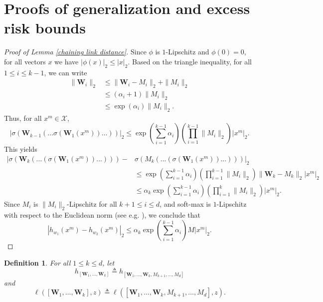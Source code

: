 \documentclass{article}
\newtheorem{definition}{Definition}
\newcommand{\X}{\mathcal{X}}
\begin{document}
\section{Proofs of generalization and excess risk bounds}\label{gen bounds section}
\begin{proof}[Proof of Lemma \ref{chaining link distance}] Since $\phi$ is $1$-Lipschitz and $\phi(0)=0$, for all vectors $x$ we have $|\phi(x)|_2\leq |x|_2$. Based on the triangle inequality, for all $1\leq i\leq k-1$, we can write 
\begin{align}
	\|\mathbf{W}_i\|_2&\leq \|\mathbf{W}_i-M_i\|_2+\|M_i\|_2\nonumber\\
					  &\leq (\alpha_i+1)\|M_i\|_2\nonumber\\
					  &\leq \exp(\alpha_i)\|M_i\|_2.\nonumber
\end{align}
Thus, for all $x^m\in \X$,
\begin{equation}
	|\sigma(\mathbf{W}_{k-1}(\dots \sigma(\mathbf{W}_1(x^m))\dots ))|_2\leq \exp\left(\sum_{i=1}^{k-1}\alpha_i\right)\left(\prod_{i=1}^{k-1}\|M_i\|_2\right)|x^m|_2. \nonumber
\end{equation}
This yields
\begin{align}
	|\sigma(\mathbf{W}_{k}(\dots(\sigma(\mathbf{W}_1(x^m))\dots)))-&\sigma(M_{k}(\dots(\sigma(\mathbf{W}_1(x^m))\dots)))|_2\nonumber\\
	&\leq \exp\left(\sum_{i=1}^{k-1}\alpha_i\right)\left(\prod_{i=1}^{k-1}\|M_i\|_2\right)\|\mathbf{W}_k-M_k\|_2|x^m|_2\nonumber\\
	&\leq \alpha_k \exp\left(\sum_{i=1}^{k-1}\alpha_i\right)\left(\prod_{i=1}^{k}\|M_i\|_2\right)|x^m|_2.\nonumber
\end{align}
Since $M_i$ is $\|M_i\|_2$-Lipschitz for all $k+1\leq i\leq d$, and soft-max is $1$-Lipschitz with respect to the Euclidean norm (see e.g. \cite{gao2017properties}), we conclude that
\begin{equation}
		|h_{w_1}(x^m)-h_{w_2}(x^m)|_2 \leq \alpha_k\exp\left(\sum_{i=1}^{k-1} \alpha_i\right) M|x^m|_2.\nonumber
	\end{equation}
\end{proof}
\begin{definition}
	For all $1\leq k \leq d$, let 
	\begin{equation}
	h_{[\mathbf{W}_1,\dots,\mathbf{W}_k]}\triangleq  h_{[\mathbf{W}_1,\dots,\mathbf{W}_k,M_{k+1},\dots,M_d]}\nonumber
	\end{equation}
and 
\begin{equation}
	\ell([\mathbf{W}_1,\dots,\mathbf{W}_k],z)\triangleq  \ell([\mathbf{W}_1,\dots,\mathbf{W}_k,M_{k+1},\dots,M_d],z).\nonumber
\end{equation}
\end{definition}
\end{document}
